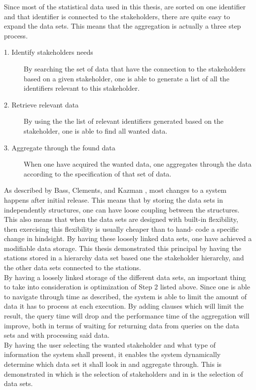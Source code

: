 Since most of the statistical data used in this thesis, are sorted on one 
identifier and that identifier is connected to the stakeholders, there are 
quite easy to expand the data sets. This means that the aggregation is actually
a three step process.

\begin{description}
	\item [1. Identify stakeholders needs] By searching the set of data that 
	have the connection to the stakeholders based on a given stakeholder, one 
	is able to generate a list of all the identifiers relevant to this 
	stakeholder.
	\item [2. Retrieve relevant data] By using the the list of relevant
	identifiers generated based on the stakeholder, one is able to find all 
	wanted data.
	\item [3. Aggregate through the found data] When one have acquired the 
	wanted data, one aggregates through the data according to the 
	specification of that set of data.
\end{description}

As described by Bass, Clements, and Kazman
\cite[pp. 117-124]{Bass:2012:SAP:2392670}, most changes to a system happens 
after initial release. This means that by storing the data sets in 
independently structures, one can have loose coupling between the structures. 
This also means that when the data sets are designed with built-in 
flexibility, then exercising this flexibility is usually cheaper than to hand-
code a specific change in hindsight. By having these loosely linked data sets,
one have achieved a modifiable data storage. This thesis demonstrated this
principal by having the stations stored in a hierarchy data set based one the 
stakeholder hierarchy, and the other data sets connected to the stations.\\

By having a loosely linked storage of the different data sets, an important
thing to take into consideration is optimization of Step 2 listed above. Since
one is able to navigate through time as described, the system is able to limit
the amount of data it has to process at each execution. By adding clauses which
will limit the result, the query time will drop and the performance time of the
aggregation will improve, both in terms of waiting for returning data from
queries on the data sets and with processing said data.\\

By having the user selecting the wanted stakeholder and what type of
information the system shall present, it enables the system dynamically
determine which data set it shall look in and aggregate through. This is
demonstrated in  which is the
selection of stakeholders and in  is the selection of data
sets.

